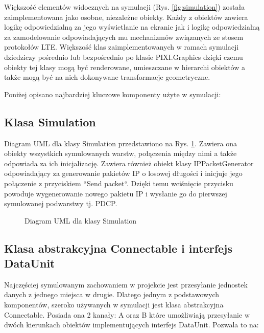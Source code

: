 Większość elementów widocznych na symulacji (Rys. \ref{fig:simulation}) została zaimplementowana jako osobne, niezależne obiekty. Każdy z obiektów zawiera logikę odpowiedzialną za jego wyświetlanie na ekranie jak i logikę odpowiedzialną za zamodelowanie odpowiadających mu mechanizmów związanych ze stosem protokołów LTE. Większość klas zaimplementowanych w ramach symulacji dziedziczy pośrednio lub bezpośrednio po klasie PIXI.Graphics dzięki czemu obiekty tej klasy mogą być renderowane, umieszczane w hierarchi obiektów a także mogą być na nich dokonywane transformacje geometryczne.

Poniżej opisano najbardziej kluczowe komponenty użyte w symulacji:

\subsection{Klasa Simulation}

Diagram UML dla klasy Simulation przedstawiono na Rys. \ref{fig:simulation_class}. Zawiera ona obiekty wszystkich symulowanych warstw, połączenia między nimi a także odpowiada za ich inicjalizację. Zawiera również obiekt klasy IPPacketGenerator odpowiadający za generowanie pakietów IP o losowej długości i inicjuje jego połączenie z przyciskiem ``Send packet``. Dzięki temu wciśnięcie przycisku powoduje wygenerowanie nowego pakietu IP i wysłanie go do pierwszej symulowanej podwarstwy tj. PDCP.

\begin{figure}[ht]
	\centerline{}
	\caption{Diagram UML dla klasy Simulation}
	\label{fig:simulation_class}
\end{figure}

\subsection{Klasa abstrakcyjna Connectable i interfejs DataUnit}

Najczęściej symulowanym zachowaniem w projekcie jest przesyłanie jednostek danych z jednego miejsca w drugie. Dlatego jednym z podstawowych komponentów, szeroko używanych w symulacji jest klasa abstrakcyjna Connectable. Posiada ona 2 kanały: A oraz B które umożliwiają przesyłanie w dwóch kierunkach obiektów implementujących interfejs DataUnit. Pozwala to na:

